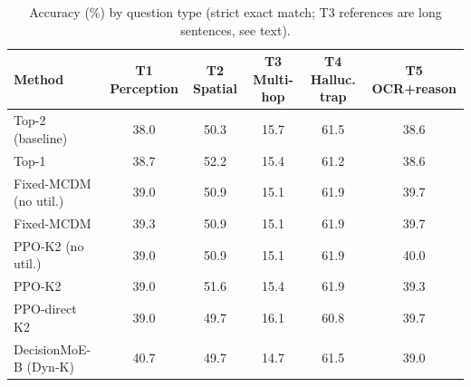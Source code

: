 \begin{table}[t]
\centering
\small
\begin{tabular}{lccccc}
\toprule
Method & T1 Perception & T2 Spatial & T3 Multi-hop & T4 Halluc. trap & T5 OCR+reason \\
\midrule
Top-2 (baseline) & 38.0 & 50.3 & 15.7 & 61.5 & 38.6 \\
Top-1 & 38.7 & 52.2 & 15.4 & 61.2 & 38.6 \\
Fixed-MCDM (no util.) & 39.0 & 50.9 & 15.1 & 61.9 & 39.7 \\
Fixed-MCDM & 39.3 & 50.9 & 15.1 & 61.9 & 39.7 \\
PPO-K2 (no util.) & 39.0 & 50.9 & 15.1 & 61.9 & 40.0 \\
PPO-K2 & 39.0 & 51.6 & 15.4 & 61.9 & 39.3 \\
PPO-direct K2 & 39.0 & 49.7 & 16.1 & 60.8 & 39.7 \\
DecisionMoE-B (Dyn-K) & 40.7 & 49.7 & 14.7 & 61.5 & 39.0 \\
\bottomrule
\end{tabular}
\caption{Accuracy (\%) by question type (strict exact match; T3 references are long sentences, see text).}
\label{tab:bytype}
\end{table}
